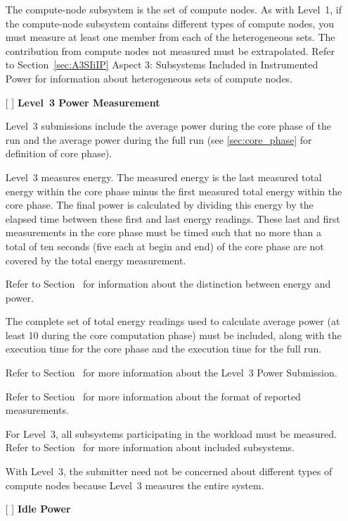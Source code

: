 \begin{itemize}
The compute-node subsystem is the set of compute nodes. As with Level~1, if the compute-node subsystem contains different types of compute nodes, you must measure at least one member from each of the heterogeneous sets. The contribution from compute nodes not measured must be extrapolated. Refer to Section~\ref{sec:A3SIiIP} Aspect 3: Subsystems Included in Instrumented Power for information about heterogeneous sets of compute nodes.

\newpage
\item[{[ ]}]
\textbf{Level~3 Power Measurement}

Level~3 submissions include the average power during the core phase of the run and the average power during the full run (see \ref{sec:core_phase} for definition of core phase).

Level~3 measures energy.
The measured energy is the last measured total energy within the core phase minus the first measured total energy within the core phase.
The final power is calculated by dividing this energy by the elapsed time between these first and last energy readings.
These last and first measurements in the core phase must be timed such that no more than a total of ten seconds (five each at begin and end) of the core phase are not covered by the total energy measurement.

Refer to Section~ for information about the distinction between energy and power.

The complete set of total energy readings used to calculate average power (at least 10 during the core computation phase) must be included, along with the execution time for the core phase and the execution time for the full run.

Refer to Section~ for more information about the Level~3 Power Submission.

Refer to Section~ for more information about the format of reported measurements.

For Level~3, all subsystems participating in the workload must be measured. Refer to 
Section~ for more information about included subsystems.

With Level~3, the submitter need not be concerned about different types of compute nodes because Level~3 measures the entire system.


\item[{[ ]}]
\textbf{Idle Power}


\end{itemize}
